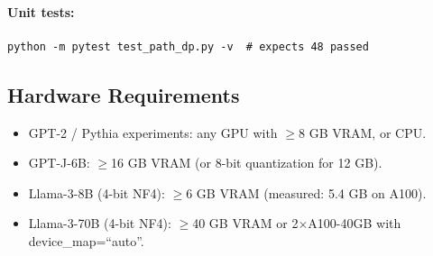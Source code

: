\documentclass{article}
\begin{document}
\paragraph{Unit tests:}
\begin{verbatim}
python -m pytest test_path_dp.py -v  # expects 48 passed
\end{verbatim}

\subsection{Hardware Requirements}

\begin{itemize}
  \item GPT-2 / Pythia experiments: any GPU with $\geq$8 GB VRAM, or CPU.
  \item GPT-J-6B: $\geq$16 GB VRAM (or 8-bit quantization for 12 GB).
  \item Llama-3-8B (4-bit NF4): $\geq$6 GB VRAM (measured: 5.4 GB on A100).
  \item Llama-3-70B (4-bit NF4): $\geq$40 GB VRAM or 2$\times$A100-40GB with device\_map=``auto''.
\end{itemize}
\end{document}
